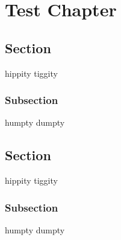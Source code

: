 \chapter{Test Chapter}
\section{Section}

hippity tiggity

\subsection{Subsection}

humpty dumpty
\section{Section}

hippity tiggity

\subsection{Subsection}

humpty dumpty